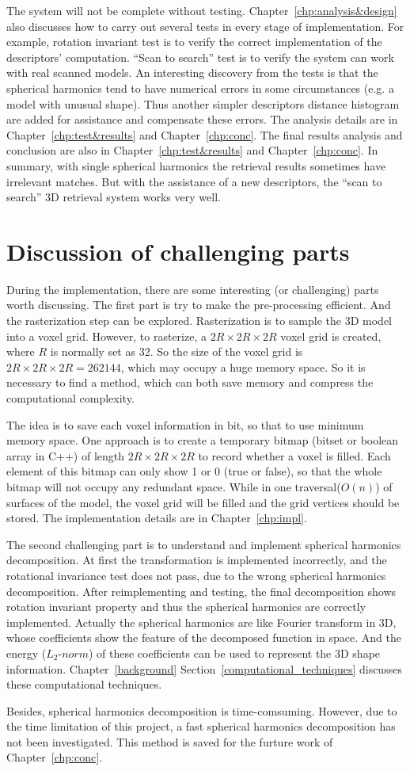 The system will not be complete without testing. Chapter~\ref{chp:analysis&design} also discusses how to carry out several tests in every stage of implementation. For example, rotation invariant test is to verify the correct implementation of the descriptors' computation. ``Scan to search'' test is to verify the system can work with real scanned models. An interesting discovery from the tests is that the spherical harmonics tend to have numerical errors in some circumstances (e.g. a model with unusual shape). Thus another simpler descriptors distance histogram are added for assistance and compensate these errors. The analysis details are in Chapter~\ref{chp:test&results} and Chapter~\ref{chp:conc}. The final results analysis and conclusion are also in Chapter~\ref{chp:test&results} and Chapter~\ref{chp:conc}. In summary, with single spherical harmonics the retrieval results sometimes have irrelevant matches. But with the assistance of a new descriptors, the ``scan to search'' 3D retrieval system works very well. 

\section{Discussion of challenging parts}

During the implementation, there are some interesting (or challenging) parts worth discussing. The first part is try to make the pre-processing efficient. And the rasterization step can be explored. Rasterization is to sample the 3D model into a voxel grid. However, to rasterize, a $2R\times2R\times2R$ voxel grid is created, where $R$ is normally set as 32. So the size of the voxel grid is $2R\times2R\times2R = 262144$, which may occupy a huge memory space. So it is necessary to find a method, which can both save memory and compress the computational complexity. 

The idea is to save each voxel information in bit, so that to use minimum memory space. One approach is to create a temporary bitmap (bitset or boolean array in C++) of length $2R\times2R\times2R$ to record whether a voxel is filled. Each element of this bitmap can only show 1 or 0 (true or false), so that the whole bitmap will not occupy any redundant space. While in one traversal($O(n)$) of surfaces of the model, the voxel grid will be filled and the grid vertices should be stored. The implementation details are in Chapter~\ref{chp:impl}. 

The second challenging part is to understand and implement spherical harmonics decomposition. At first the transformation is implemented incorrectly, and the rotational invariance test does not pass, due to the wrong spherical harmonics decomposition. After reimplementing and testing, the final decomposition shows rotation invariant property and thus the spherical harmonics are correctly implemented.  Actually the spherical harmonics are like Fourier transform in 3D, whose coefficients show the feature of the decomposed function in space. And the energy ($L_{2}$-$norm$) of these coefficients can be used to represent the 3D shape information. Chapter~\ref{background} Section~\ref{computational_techniques} discusses these computational techniques.

Besides, spherical harmonics decomposition is time-comsuming. However, due to the time limitation of this project, a fast spherical harmonics decomposition has not been investigated. This method is saved for the furture work of Chapter~\ref{chp:conc}.
